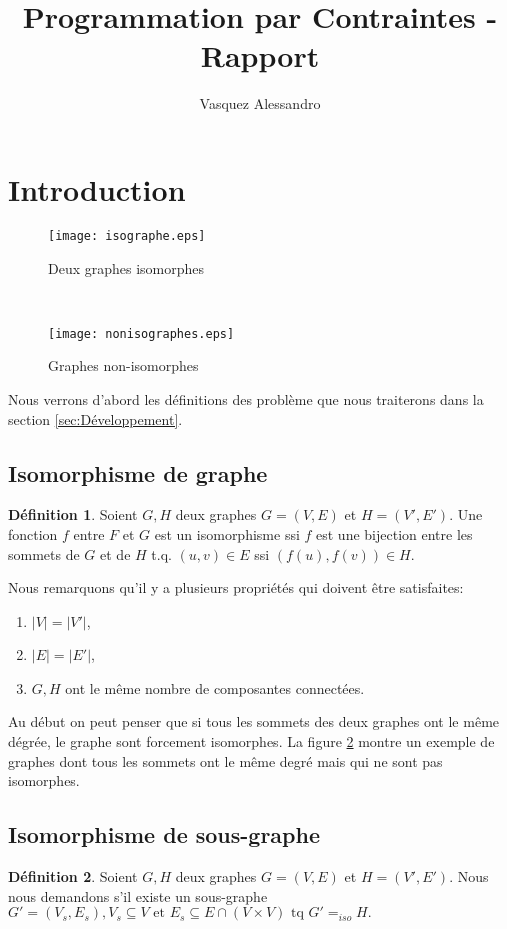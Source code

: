 \documentclass[french]{article}
\theoremstyle{definition}
\newtheorem{deff}{D\'efinition}[section]
\theoremstyle{remark}
\begin{document}
	\title{Programmation par Contraintes - Rapport}
	\author{Vasquez Alessandro}
	\maketitle
	\newpage
	\tableofcontents
	\newpage
\section{Introduction}
\label{sec:intro}
\begin{figure*}[t!]
	\centering
	\begin{subfigure}[t]{0.5\textwidth}
		\centering
		\texttt{[image: isographe.eps]}
		\caption{\label{fig:isographstar}Deux graphes isomorphes}
	\end{subfigure}%
	~ 
	\begin{subfigure}[t]{0.5\textwidth}
		\centering
		\texttt{[image: nonisographes.eps]}
		\caption{\label{fig:nonisograph}Graphes  non-isomorphes}
	\end{subfigure}
	\caption{Isomorphisme, examples}
\end{figure*}

Nous verrons d'abord les définitions des problème que nous traiterons dans la section \ref{sec:Développement}.
\subsection{Isomorphisme de graphe}
\begin{deff}
Soient $G, H$ deux graphes $G=(V, E)$ et $H=(V', E')$. Une fonction $f$ entre $ F $ et $ G $ est un isomorphisme ssi $ f $ est une bijection entre les sommets de $ G $ et de $ H $ t.q. $ (u,v) \in E$ ssi $ (f(u), f(v)) \in H$.
\end{deff}
Nous remarquons qu'il y a plusieurs propriétés qui doivent être satisfaites:
 \begin{enumerate}[label=(\roman*)]
 	\item $|V|=|V'|$,
 	\item $|E|=|E'|$,
 	\item $G, H$ ont le même nombre de composantes connectées.
 \end{enumerate}
Au début on peut penser que si tous les sommets des deux graphes ont le même dégrée, le graphe sont forcement isomorphes. 
La figure \ref{fig:nonisograph} montre un exemple de graphes dont tous les sommets ont le même degré mais qui ne sont pas isomorphes.
\subsection{Isomorphisme de sous-graphe}
\begin{deff}
Soient $G, H$ deux graphes $G=(V, E)$ et $H=(V', E')$. Nous nous demandons s'il existe un sous-graphe $ G'=(V_s, E_s), V_s \subseteq V \text{ et } E_s \subseteq E \cap (V \times V) \text{ tq } G' =_{iso} H. $
\end{deff}
\end{document}
